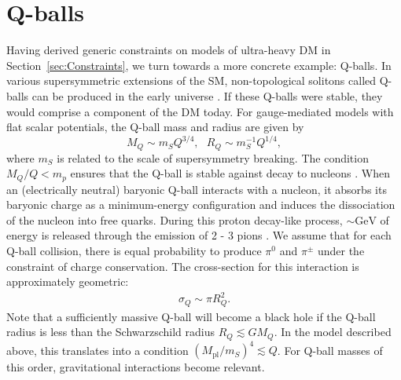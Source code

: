 \documentclass[twocolumn,showpacs,preprintnumbers,amsmath,amssymb,prd]{revtex4}
\begin{document}
\section{Q-balls}
\label{sec:QBalls}

Having derived generic constraints on models of ultra-heavy DM in Section~\ref{sec:Constraints}, we turn towards a more concrete example: Q-balls.
In various supersymmetric extensions of the SM, non-topological solitons called Q-balls can be produced in the early universe \cite{Coleman:1985ki, Kusenko:1997si}.
If these Q-balls were stable, they would comprise a component of the DM today.
For gauge-mediated models with flat scalar potentials, the Q-ball mass and radius are given by
\begin{equation}
\label{eq:Qballprop}
M_Q \sim m_S Q^{3/4}, ~~~ R_Q \sim m_S^{-1} Q^{1/4},
\end{equation}
where $m_S$ is related to the scale of supersymmetry breaking.
The condition $M_Q/Q < m_p$ ensures that the Q-ball is stable against decay to nucleons \cite{Dine:2003ax}.
When an (electrically neutral) baryonic Q-ball interacts with a nucleon, it absorbs its baryonic charge as a minimum-energy configuration and induces the dissociation of the nucleon into free quarks.
During this proton decay-like process, $\sim \text{GeV}$ of energy is released through the emission of 2 - 3 pions \cite{Dine:2003ax}.
We assume that for each Q-ball collision, there is equal probability to produce $\pi^0$ and $\pi^\pm$ under the constraint of charge conservation.
The cross-section for this interaction is approximately geometric:
\begin{align}
\sigma_Q \sim \pi R_Q^2.
\end{align}
Note that a sufficiently massive Q-ball will become a black hole if the Q-ball radius is less than the Schwarzschild radius $R_Q \lesssim G M_Q$.
In the model described above, this translates into a condition $(M_\text{pl}/m_S)^4 \lesssim Q$.
For Q-ball masses of this order, gravitational interactions become relevant.
\end{document}
